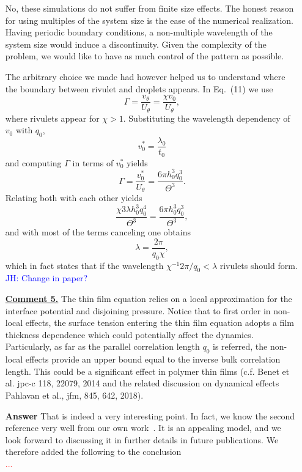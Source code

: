 \documentclass[12pt,english]{article}
\newcommand{\JH}[1]{\textcolor{blue}{JH: #1}}
\begin{document}
\begin{itemize}
{No, these simulations do not suffer from finite size effects.
The honest reason for using multiples of the system size is the ease of the numerical realization.
Having periodic boundary conditions, a non-multiple wavelength of the system size would induce a discontinuity.
Given the complexity of the problem, we would like to have as much control of the pattern as possible.

The arbitrary choice we made had however helped us to understand where the boundary between rivulet and droplets appears.
In Eq.~(11) we use
\begin{equation*}
    \Gamma = \frac{v_{\theta}}{U_{\theta}} = \frac{\chi v_0}{U_{\theta}},
\end{equation*}
where rivulets appear for $\chi > 1$.
Substituting the wavelength dependency of $v_0$ with $q_0$,
\begin{equation*}
    v_0^{\ast} = \frac{\lambda_0}{t_0} 
\end{equation*}
and computing $\Gamma$ in terms of $v_0^{\ast}$ yields
\begin{equation*}
    \Gamma = \frac{v_0^{\ast}}{U_{\theta}} = \frac{6\pi h_0^3 q_0^3}{\Theta^3}.
\end{equation*}
Relating both with each other yields
\begin{equation*}
    \frac{\chi 3\lambda h_0^3 q_0^4}{\Theta^3} = \frac{6\pi h_0^3 q_0^3}{\Theta^3},
\end{equation*}
and with most of the terms canceling one obtains
\begin{equation*}
    \lambda = \frac{2\pi}{q_0\chi}, 
\end{equation*}
which in fact states that if the wavelength $\chi^{-1}2\pi/q_0 < \lambda$ rivulets should form. 
\JH{Change in paper?}
}

\item[ \textbf{\underline{Comment 5.}}]
{
The thin film equation relies on a local approximation for the interface potential and disjoining pressure. 
Notice that to first order in non-local effects, the surface tension entering the thin film equation adopts a film thickness dependence which could potentially affect the dynamics. 
Particularly, as far as the parallel correlation length $q_0$ is referred, the non-local effects provide an upper bound equal to the inverse bulk correlation length. 
This could be a significant effect in polymer thin films (c.f. Benet et al. jpc-c 118, 22079, 2014 and the related discussion on dynamical effects Pahlavan et al., jfm, 845, 642, 2018).
}

\item[ \textbf{{Answer}}]
{
That is indeed a very interesting point.
In fact, we know the second reference very well from our own work~\cite{PhysRevE.104.034801}.
It is an appealing model, and we look forward to discussing it in further details in future publications.
We therefore added the following to the conclusion 
\\
\textcolor{red}{...}
}

\end{itemize}




\end{document}
